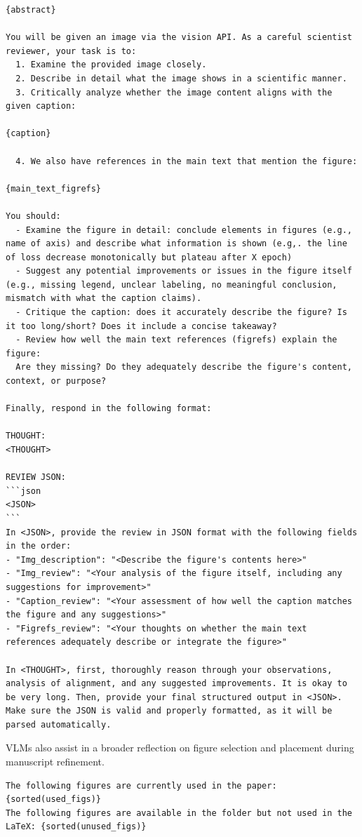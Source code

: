 \begin{appendices}
\begin{tcolorbox}[breakable, colback=orange!5!white, colframe=orange!80!black, title=VLM Figure Review Prompt]
\begin{Verbatim}[breaklines, breaksymbol={}, breaksymbolleft={}, fontsize=\small]
{abstract}

You will be given an image via the vision API. As a careful scientist reviewer, your task is to:
  1. Examine the provided image closely.
  2. Describe in detail what the image shows in a scientific manner.
  3. Critically analyze whether the image content aligns with the given caption:

{caption}

  4. We also have references in the main text that mention the figure:

{main_text_figrefs}

You should:
  - Examine the figure in detail: conclude elements in figures (e.g., name of axis) and describe what information is shown (e.g,. the line of loss decrease monotonically but plateau after X epoch)
  - Suggest any potential improvements or issues in the figure itself (e.g., missing legend, unclear labeling, no meaningful conclusion, mismatch with what the caption claims).
  - Critique the caption: does it accurately describe the figure? Is it too long/short? Does it include a concise takeaway?
  - Review how well the main text references (figrefs) explain the figure:
  Are they missing? Do they adequately describe the figure's content, context, or purpose?

Finally, respond in the following format:

THOUGHT:
<THOUGHT>

REVIEW JSON:
```json
<JSON>
```
In <JSON>, provide the review in JSON format with the following fields in the order:
- "Img_description": "<Describe the figure's contents here>"
- "Img_review": "<Your analysis of the figure itself, including any  suggestions for improvement>"
- "Caption_review": "<Your assessment of how well the caption matches  the figure and any suggestions>"
- "Figrefs_review": "<Your thoughts on whether the main text references adequately describe or integrate the figure>"

In <THOUGHT>, first, thoroughly reason through your observations, analysis of alignment, and any suggested improvements. It is okay to be very long. Then, provide your final structured output in <JSON>. Make sure the JSON is valid and properly formatted, as it will be parsed automatically.
\end{Verbatim}
\end{tcolorbox}

VLMs also assist in a broader reflection on figure selection and placement during manuscript refinement.
\begin{tcolorbox}[breakable, colback=orange!5!white, colframe=orange!80!black, title=VLM-Assisted Manuscript Figure Reflection Prompt]
\begin{Verbatim}[breaklines, breaksymbol={}, breaksymbolleft={}, fontsize=\small]
The following figures are currently used in the paper:
{sorted(used_figs)}
The following figures are available in the folder but not used in the
LaTeX: {sorted(unused_figs)}


\end{Verbatim}
\end{tcolorbox}
\end{appendices}
